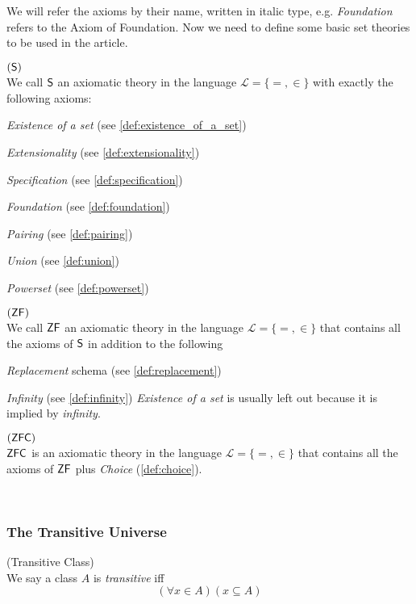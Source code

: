 We will refer the axioms by their name, written in italic type, e.g. \emph{Foundation} refers to the Axiom of Foundation. Now we need to define some basic set theories to be used in the article. 

\begin{definition}{$(\sf{S})$}\label{def:s}\\
We call $\sf{S}$ an axiomatic theory in the language $\mathscr{L} = \{=, \in\}$ with exactly the following axioms:
\bce[(i)]
\item \emph{Existence of a set} (see \ref{def:existence_of_a_set})
\item \emph{Extensionality} (see \ref{def:extensionality})
\item \emph{Specification} (see \ref{def:specification})
\item \emph{Foundation} (see \ref{def:foundation})
\item \emph{Pairing} (see \ref{def:pairing})
\item \emph{Union} (see \ref{def:union})
\item \emph{Powerset} (see \ref{def:powerset})
\ece
\end{definition}

\begin{definition}{$(\sf{ZF})$}\label{def:zf}\\
We call $\sf{ZF}$ an axiomatic theory in the language $\mathscr{L} = \{=, \in\}$ that contains all the axioms of $\sf{S}$ in addition to the following
\bce[(i)]
\item \emph{Replacement} schema (see \ref{def:replacement})
\item \emph{Infinity} (see \ref{def:infinity})
\ece
\emph{Existence of a set} is usually left out because it is implied by \emph{infinity}.
\end{definition}

\begin{definition}{$(\sf{ZFC})$}\label{def:zfc}\\
$\sf{ZFC}$ is an axiomatic theory in the language $\mathscr{L} = \{=, \in\}$ that contains all the axioms of $\sf{ZF}$ plus \emph{Choice} (\ref{def:choice}).
\end{definition}

\

\subsubsection{The Transitive Universe}
\begin{definition}{(Transitive Class)}\label{def:transitivity}\\
We say a class $A$ is \emph{transitive} iff
\begin{equation}
(\forall x \in A)(x \subseteq A)
\end{equation}
\end{definition}

